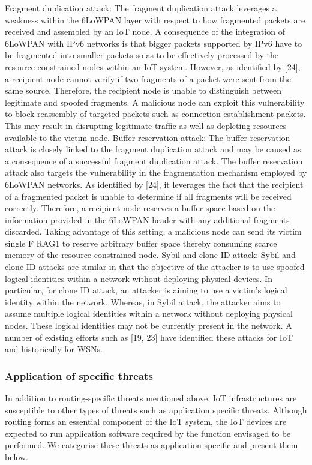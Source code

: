 \documentclass[letterpaper, 10 pt, conference]{ieeeconf}  %
\begin{document}
Fragment duplication attack: The fragment duplication attack leverages a weakness within the 6LoWPAN layer with respect to how fragmented packets are received and assembled by an IoT node. A consequence of the integration of 6LoWPAN with IPv6 networks is that bigger packets supported by IPv6 have to be fragmented into smaller packets so as to be effectively processed by the resource-constrained nodes within an IoT system. However, as identified by [24], a recipient node cannot verify if two fragments of a packet were sent from the same source. Therefore, the recipient node is unable to distinguish between legitimate and spoofed fragments. A malicious node can exploit this vulnerability to block reassembly of targeted packets such as connection establishment packets. This may result in disrupting legitimate traffic as well as depleting resources available to the victim node.
Buffer reservation attack: The buffer reservation attack is closely linked to the fragment duplication attack and may be caused as a consequence of a successful fragment duplication attack. The buffer reservation attack also targets the vulnerability in the fragmentation mechanism employed by 6LoWPAN networks. As identified by [24], it leverages the fact that the recipient of a fragmented packet is unable to determine if all fragments will be received correctly. Therefore, a recipient node reserves a buffer space based on the information provided in the 6LoWPAN header with any additional fragments discarded. Taking advantage of this setting, a malicious node can send its victim single F RAG1 to reserve arbitrary buffer space thereby consuming scarce memory of the resource-constrained node.
Sybil and clone ID attack: Sybil and clone ID attacks are similar in that the objective of the attacker is to use spoofed logical identities within a network without deploying physical devices. In particular, for clone ID attack, an attacker is aiming to use a victim's logical identity within the network. Whereas, in Sybil attack, the attacker aims to assume multiple logical identities within a network without deploying physical nodes. These logical identities may not be currently present in the network. A number of existing efforts such as [19, 23] have identified these attacks for IoT and historically for WSNs. \cite{c8}\\

\subsubsection{Application of specific threats}
In addition to routing-specific threats mentioned above, IoT infrastructures are susceptible to other types of threats such as application specific threats. Although routing forms an essential component of the IoT system, the IoT devices are expected to run application software required by the function envisaged to be performed. We categorise these threats as application specific and present them below. \\
\end{document}
